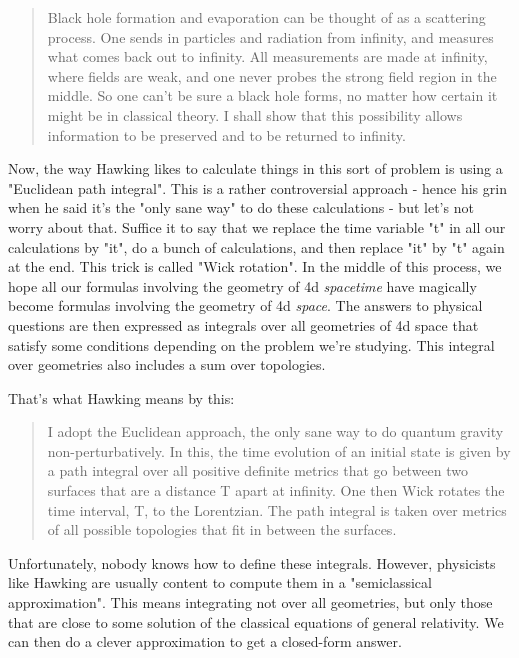 \begin{quote}
     Black hole formation and evaporation can be thought of as a
     scattering process. One sends in particles and radiation from
     infinity, and measures what comes back out to infinity.  All
     measurements are made at infinity, where fields are weak, and one
     never probes the strong field region in the middle.  So one can't 
     be sure a black hole forms, no matter how certain it might be in
     classical theory.  I shall show that this possibility allows
     information to be preserved and to be returned to infinity.
\end{quote}

Now, the way Hawking likes to calculate things in this sort of 
problem is using a "Euclidean path integral".  This is a rather
controversial approach - hence his grin when he said it's the 
"only sane way" to do these calculations - but let's not worry about
that.   Suffice it to say that we replace the time variable "t"
in all our calculations by "it", do a bunch of calculations, and 
then replace "it" by "t" again at the end.   
This trick is called
"Wick rotation".  In the middle of this process, we hope all our 
formulas involving the geometry of 4d \emph{spacetime} have magically 
become formulas involving the geometry of 4d \emph{space}.   The answers 
to physical questions are then expressed as integrals over all 
geometries of 4d space that satisfy some conditions depending on 
the problem we're studying.   This integral over geometries also
includes a sum over topologies.  

That's what Hawking means by this:

\begin{quote}
     I adopt the Euclidean approach, the only sane way to do quantum
     gravity non-perturbatively.  In this, the time evolution of an 
     initial state is given by a path integral over all positive 
     definite metrics that go between two surfaces that are a distance 
     T apart at infinity.  One then Wick rotates the time interval, T, 
     to the Lorentzian.  The path integral is taken over metrics of 
     all possible topologies that fit in between the surfaces.  
\end{quote}

Unfortunately, nobody knows how to define these integrals.  However,
physicists like Hawking are usually content to compute them in a
"semiclassical approximation".  This means integrating not over all
geometries, but only those that are close to some solution of the 
classical equations of general relativity.  We can then do a clever 
approximation to get a closed-form answer.

